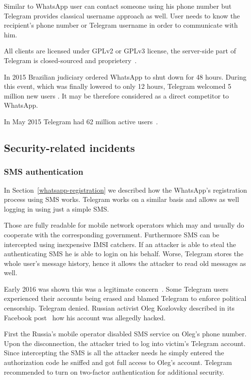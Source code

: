 \documentclass[thesis=M,english]{FITthesis}[2012/10/20]
\begin{document}
Similar to WhatsApp user can contact someone using his phone number but Telegram provides classical username approach as well. User needs to know the recipient's phone number or Telegram username in order to communicate with him.

All clients are licensed under GPLv2 or GPLv3 license, the server-side part of Telegram is closed-sourced and proprietery~\cite{telegram-server}.

In 2015 Brazilian judiciary ordered WhatsApp to shut down for 48 hours. During this event, which was finally lowered to only 12 hours, Telegram welcomed 5 million new users \cite{whatsappbrazil}. It may be therefore considered as a direct competitor to WhatsApp.

In May 2015 Telegram had 62 million active users~\cite{telegram-users}.


\subsection{Security-related incidents}

\subsubsection{SMS authentication}

In Section~\ref{whatsapp-registration} we described how the WhatsApp's registration process using SMS works. Telegram works on a similar basis and allows as well logging in using just a simple SMS.

Those are fully readable for mobile network operators which may and usually do cooperate with the corresponding government. Furthermore SMS can be intercepted using inexpensive IMSI catchers. If an attacker is able to steal the authenticating SMS he is able to login on his behalf. Worse, Telegram stores the whole user's message history, hence it allows the attacker to read old messages as well.

Early 2016 was shown this was a legitimate concern~\cite{telegram-smsiran}. Some Telegram users experienced their accounts being erased and blamed Telegram to enforce political censorship. Telegram denied. Russian activist Oleg Kozlovsky described in its Facebook post~\cite{telegram-russia} how his account was allegedly hacked.

First the Russia's mobile operator disabled SMS service on Oleg's phone number. Upon the disconnection, the attacker tried to log into victim's Telegram account. Since intercepting the SMS is all the attacker needs he simply entered the authorization code he sniffed and got full access to Oleg's account. Telegram recommended to turn on two-factor authentication for additional security.
\end{document}
